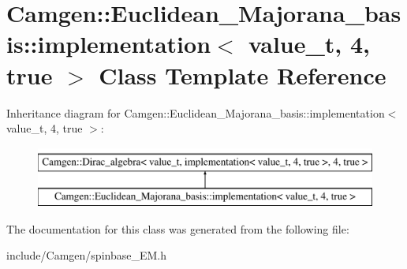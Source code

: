 \hypertarget{a00302}{}\section{Camgen\+:\+:Euclidean\+\_\+\+Majorana\+\_\+basis\+:\+:implementation$<$ value\+\_\+t, 4, true $>$ Class Template Reference}
\label{a00302}
Inheritance diagram for Camgen\+:\+:Euclidean\+\_\+\+Majorana\+\_\+basis\+:\+:implementation$<$ value\+\_\+t, 4, true $>$\+:\begin{figure}[H]
\begin{center}
\leavevmode
\includegraphics[height=2.000000cm]{a00302}
\end{center}
\end{figure}


The documentation for this class was generated from the following file\+:\begin{DoxyCompactItemize}
\item 
include/\+Camgen/spinbase\+\_\+\+E\+M.\+h\end{DoxyCompactItemize}
